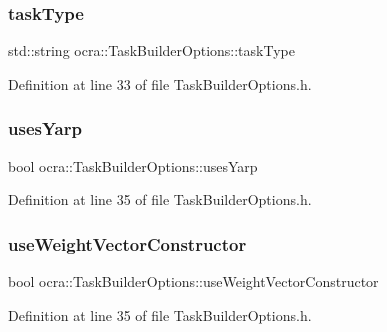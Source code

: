 \subsubsection{\texorpdfstring{task\+Type}{taskType}}
{\footnotesize\ttfamily std\+::string ocra\+::\+Task\+Builder\+Options\+::task\+Type}



Definition at line 33 of file Task\+Builder\+Options.\+h.

\hypertarget{classocra_1_1TaskBuilderOptions_a6f0d1b177c931644f4d66f04b901d565}{}\label{classocra_1_1TaskBuilderOptions_a6f0d1b177c931644f4d66f04b901d565} 
\subsubsection{\texorpdfstring{uses\+Yarp}{usesYarp}}
{\footnotesize\ttfamily bool ocra\+::\+Task\+Builder\+Options\+::uses\+Yarp}



Definition at line 35 of file Task\+Builder\+Options.\+h.

\hypertarget{classocra_1_1TaskBuilderOptions_a5a5d3c5952de35efb29c60c843edafb6}{}\label{classocra_1_1TaskBuilderOptions_a5a5d3c5952de35efb29c60c843edafb6} 
\subsubsection{\texorpdfstring{use\+Weight\+Vector\+Constructor}{useWeightVectorConstructor}}
{\footnotesize\ttfamily bool ocra\+::\+Task\+Builder\+Options\+::use\+Weight\+Vector\+Constructor}



Definition at line 35 of file Task\+Builder\+Options.\+h.

\hypertarget{classocra_1_1TaskBuilderOptions_a0c60b260526aa7bf2fdb3712cc7f612d}{}\label{classocra_1_1TaskBuilderOptions_a0c60b260526aa7bf2fdb3712cc7f612d} 

